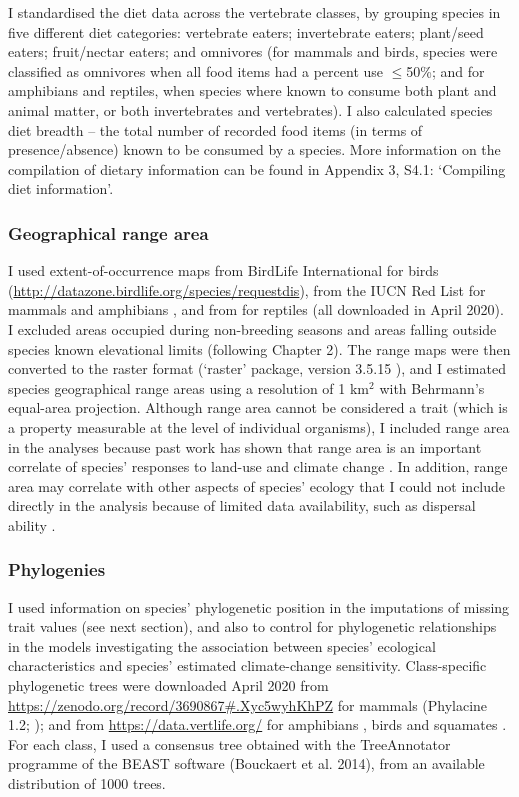 I standardised the diet data across the vertebrate classes, by grouping species in five different diet categories: vertebrate eaters; invertebrate eaters; plant/seed eaters; fruit/nectar eaters; and omnivores  (for mammals and birds, species were classified as omnivores when all food items had a percent use $\leq$50\%; and for amphibians and reptiles, when species where known to consume both plant and animal matter, or both invertebrates and vertebrates). I also calculated species diet breadth -- the total number of recorded food items (in terms of presence/absence) known to be consumed by a species. More information on the compilation of dietary information can be found in Appendix 3, S4.1: `Compiling diet information'. 

\subsubsection{Geographical range area}
I used extent-of-occurrence maps from BirdLife International for birds (\url{http://datazone.birdlife.org/species/requestdis}), from the IUCN Red List for mammals and amphibians \citep{IUCN2020}, and from \citet{Roll2017} for reptiles (all downloaded in April 2020). I excluded areas occupied during non-breeding seasons and areas falling outside species known elevational limits (following Chapter 2). The range maps were then converted to the raster format (`raster' package, version 3.5.15 \citet{rasterpackage}), and I estimated species geographical range areas using a resolution of 1 km$^2$ with Behrmann's equal-area projection.  Although range area cannot be considered a trait (which is a property measurable at the level of individual organisms), I included range area in the analyses because past work has shown that range area is an important correlate of species' responses to land-use \citep{Newbold2018a} and climate change \citep{Thuiller2005}. In addition, range area may correlate with other aspects of species' ecology that I could not include directly in the analysis because of limited data availability, such as dispersal ability \citep{Capurucho2020}.

\subsubsection{Phylogenies}
I used information on species' phylogenetic position in the imputations of missing trait values (see next section), and also to control for phylogenetic relationships in the models investigating the association between species' ecological characteristics and species' estimated climate-change sensitivity. Class-specific phylogenetic trees were downloaded April 2020 from \url{https://zenodo.org/record/3690867#.Xyc5wyhKhPZ} for mammals (Phylacine 1.2; \citet{Faurby2018, Faurby2020}); and from \url{https://data.vertlife.org/} for amphibians \citep{Jetz2018}, birds \citep{Jetz2012} and squamates \citep{Tonini2016}. For each class, I used a consensus tree obtained with the TreeAnnotator programme of the BEAST software (Bouckaert et al. 2014), from an available distribution of 1000 trees. 

